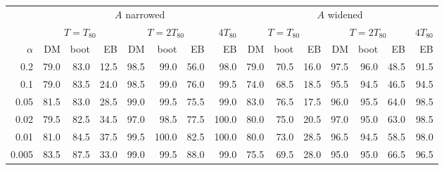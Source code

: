 \setlength{\tabcolsep}{4pt}\begin{tabular}{rrrrrrrrrrrrrrr}
\toprule
 & \multicolumn{7}{c}{$A$ narrowed} & \multicolumn{7}{c}{$A$ widened}\\
\cmidrule(lr){2-8}\cmidrule(lr){9-15}
 & \multicolumn{3}{c}{$T=T_{80}$} & \multicolumn{3}{c}{$T=2T_{80}$} & $4T_{80}$ & \multicolumn{3}{c}{$T=T_{80}$} & \multicolumn{3}{c}{$T=2T_{80}$} & $4T_{80}$\\
$\alpha$ & DM & boot & EB & DM & boot & EB & EB & DM & boot & EB & DM & boot & EB & EB\\
\midrule
0.2 & 79.0 & 83.0 & 12.5 & 98.5 & 99.0 & 56.0 & 98.0 & 79.0 & 70.5 & 16.0 & 97.5 & 96.0 & 48.5 & 91.5\\
0.1 & 79.0 & 83.5 & 24.0 & 98.5 & 99.0 & 76.0 & 99.5 & 74.0 & 68.5 & 18.5 & 95.5 & 94.5 & 46.5 & 94.5\\
0.05 & 81.5 & 83.0 & 28.5 & 99.0 & 99.5 & 75.5 & 99.0 & 83.0 & 76.5 & 17.5 & 96.0 & 95.5 & 64.0 & 98.5\\
0.02 & 79.5 & 82.5 & 34.5 & 97.0 & 98.5 & 77.5 & 100.0 & 80.0 & 75.0 & 20.5 & 97.0 & 95.0 & 63.0 & 98.5\\
0.01 & 81.0 & 84.5 & 37.5 & 99.5 & 100.0 & 82.5 & 100.0 & 80.0 & 73.0 & 28.5 & 96.5 & 94.5 & 58.5 & 98.0\\
0.005 & 83.5 & 87.5 & 33.0 & 99.0 & 99.5 & 88.0 & 99.0 & 75.5 & 69.5 & 28.0 & 95.0 & 95.0 & 66.5 & 96.5\\
\bottomrule
\end{tabular}
